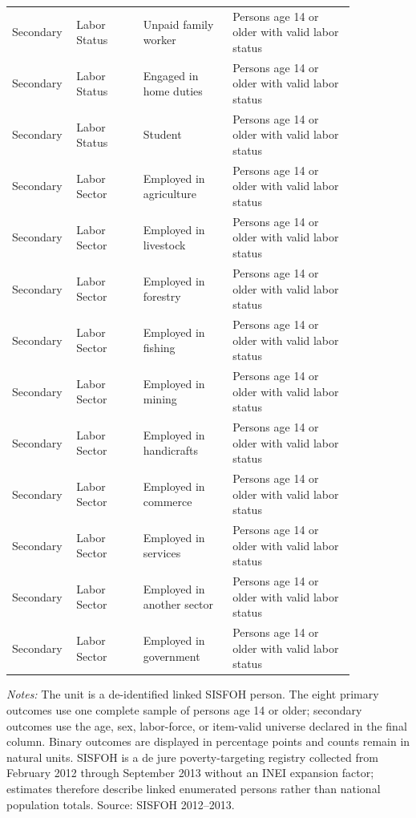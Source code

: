 \begin{longtable}{p{0.10\linewidth}p{0.18\linewidth}p{0.24\linewidth}p{0.33\linewidth}}
Secondary & Labor Status & Unpaid family worker & Persons age 14 or older with valid labor status \\
Secondary & Labor Status & Engaged in home duties & Persons age 14 or older with valid labor status \\
Secondary & Labor Status & Student & Persons age 14 or older with valid labor status \\
Secondary & Labor Sector & Employed in agriculture & Persons age 14 or older with valid labor status \\
Secondary & Labor Sector & Employed in livestock & Persons age 14 or older with valid labor status \\
Secondary & Labor Sector & Employed in forestry & Persons age 14 or older with valid labor status \\
Secondary & Labor Sector & Employed in fishing & Persons age 14 or older with valid labor status \\
Secondary & Labor Sector & Employed in mining & Persons age 14 or older with valid labor status \\
Secondary & Labor Sector & Employed in handicrafts & Persons age 14 or older with valid labor status \\
Secondary & Labor Sector & Employed in commerce & Persons age 14 or older with valid labor status \\
Secondary & Labor Sector & Employed in services & Persons age 14 or older with valid labor status \\
Secondary & Labor Sector & Employed in another sector & Persons age 14 or older with valid labor status \\
Secondary & Labor Sector & Employed in government & Persons age 14 or older with valid labor status \\
\bottomrule
\end{longtable}
\begin{minipage}{0.98\linewidth}\footnotesize\textit{Notes:} The unit is a de-identified linked SISFOH person. The eight primary outcomes use one complete sample of persons age 14 or older; secondary outcomes use the age, sex, labor-force, or item-valid universe declared in the final column. Binary outcomes are displayed in percentage points and counts remain in natural units. SISFOH is a de jure poverty-targeting registry collected from February 2012 through September 2013 without an INEI expansion factor; estimates therefore describe linked enumerated persons rather than national population totals. Source: SISFOH 2012--2013.\end{minipage}
\endgroup
